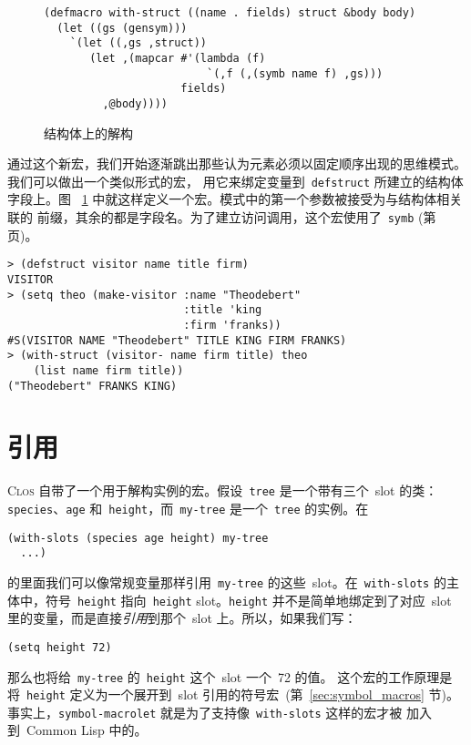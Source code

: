 \begin{figure}
\begin{lstlisting}
(defmacro with-struct ((name . fields) struct &body body)
  (let ((gs (gensym)))
    `(let ((,gs ,struct))
       (let ,(mapcar #'(lambda (f)
                         `(,f (,(symb name f) ,gs)))
                     fields)
         ,@body))))
\end{lstlisting}
  \caption{结构体上的解构}
  \label{fig:destructuring_on_structures}
\end{figure}

通过这个新宏，我们开始逐渐跳出那些认为元素必须以固定顺序出现的思维模式。我们可以做出一个类似形式的宏，
用它来绑定变量到~\texttt{defstruct} 所建立的结构体字段上。图
~\ref{fig:destructuring_on_structures} 中就这样定义一个宏。模式中的第一个参数被接受为与结构体相关联的
前缀，其余的都是字段名。为了建立访问调用，这个宏使用了~\texttt{symb}
(第~\pageref{fig:functions_which_operate_on_symbols_and_strings} 页)。
\begin{lstlisting}
> (defstruct visitor name title firm)
VISITOR
> (setq theo (make-visitor :name "Theodebert"
                           :title 'king
                           :firm 'franks))
#S(VISITOR NAME "Theodebert" TITLE KING FIRM FRANKS)
> (with-struct (visitor- name firm title) theo
    (list name firm title))
("Theodebert" FRANKS KING)
\end{lstlisting}

\section{引用}
\label{sec:destructuring:reference}

\textsc{Clos} 自带了一个用于解构实例的宏。假设~\texttt{tree} 是一个带有三个~slot
的类：\texttt{species}、\texttt{age} 和~\texttt{height}，而~\texttt{my-tree}
是一个~\texttt{tree} 的实例。在
\begin{lstlisting}
(with-slots (species age height) my-tree
  ...)
\end{lstlisting}
的里面我们可以像常规变量那样引用~\texttt{my-tree} 的这些~slot。在~\texttt{with-slots}
的主体中，符号~\texttt{height} 指向~\texttt{height} slot。\texttt{height} 并不是简单地绑定到了对应~slot 里的变量，而是直接\emph{引用}到那个~slot 上。所以，如果我们写：
\begin{lstlisting}
(setq height 72)
\end{lstlisting}
那么也将给~\texttt{my-tree} 的~\texttt{height} 这个~slot 一个~72 的值。
这个宏的工作原理是
将~\texttt{height} 定义为一个展开到~slot 引用的符号宏~(第~\ref{sec:symbol_macros}
节)。
事实上，\texttt{symbol-macrolet} 就是为了支持像~\texttt{with-slots} 这样的宏才被
加入到~Common Lisp 中的。

